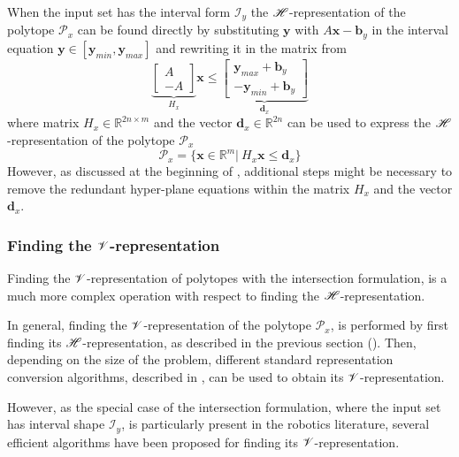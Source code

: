 When the input set has the interval form $\mathcal{I}_y$ the $\mathscr{H}$-representation of the polytope $\mathcal{P}_x$ can be found directly by substituting $\bm{y}$ with $A\bm{x}-\bm{b}_y$ in the interval equation $\bm{y}\in[\bm{y}_{min},\bm{y}_{max}]$ and rewriting it in the matrix from
\begin{equation}
   \underbrace{\begin{bmatrix}
        A\\
        -A
    \end{bmatrix}}_{H_x}\bm{x} \leq \underbrace{\begin{bmatrix}
         \bm{y}_{max} + \bm{b}_y\\
        -\bm{y}_{min} + \bm{b}_y 
    \end{bmatrix} }_{\bm{d}_x}
\end{equation}
where matrix $H_x\in\mathbb{R}^{2n \times m}$ and the vector $\bm{d}_x\in\mathbb{R}^{2n}$ can be used to express the $\mathscr{H}$-representation of the polytope $\mathcal{P}_x$
\begin{equation}
    \mathcal{P}_x=\{\bm{x}\in\mathbb{R}^m |~ H_x\bm{x} \leq \bm{d}_x \}
    \label{eq:inter_h_rep}
\end{equation}
However, as discussed at the beginning of , additional steps might be necessary to remove the redundant hyper-plane equations within the matrix $H_x$ and the vector $\bm{d}_x$.


\subsubsection{Finding the $\mathscr{V}$-representation} 
\label{ch:inter_v_rep}
Finding the $\mathscr{V}$-representation of polytopes with the intersection formulation, is a much more complex operation with respect to finding the $\mathscr{H}$-representation. 

In general, finding the $\mathscr{V}$-representation of the polytope $\mathcal{P}_x$, is performed by first finding its $\mathscr{H}$-representation, as described in the previous section (). Then, depending on the size of the problem, different standard representation conversion algorithms, described in , can be used to obtain its $\mathscr{V}$-representation.

However, as the special case of the intersection formulation, where the input set has interval shape $\mathcal{I}_y$, is particularly present in the robotics literature, several efficient algorithms have been proposed for finding its $\mathscr{V}$-representation.



